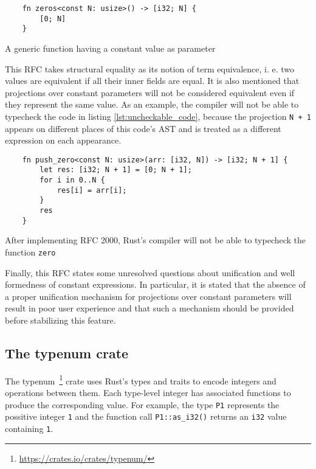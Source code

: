 \begin{listing}[ht]
	\begin{verbatim}
    fn zeros<const N: usize>() -> [i32; N] {
        [0; N]
    }
	\end{verbatim}
    \caption{A generic function having a constant value as parameter}
  \label{lst:const_generics}
\end{listing}

This RFC takes structural equality as its notion of term equivalence, i. e. two
values are equivalent if all their inner fields are equal. It is also mentioned
that projections over constant parameters will not be considered equivalent even
if they represent the same value. As an example, the compiler will not be able
to typecheck the code in listing \ref{lst:uncheckable_code}, because the
projection \texttt{N + 1} appears on different places of this code's AST and is
treated as a different expression on each appearance.

\begin{listing}[ht]
	\begin{verbatim}
    fn push_zero<const N: usize>(arr: [i32, N]) -> [i32; N + 1] {
        let res: [i32; N + 1] = [0; N + 1];
        for i in 0..N {
            res[i] = arr[i];
        }
        res
    }
	\end{verbatim}
  \caption{After implementing RFC 2000, Rust's compiler will not be able to
  typecheck the function \texttt{zero}}
  \label{lst:uncheckable_code}
\end{listing}

Finally, this RFC states some unresolved questions about unification and well
formedness of constant expressions. In particular, it is stated that the absence
of a proper unification mechanism for projections over constant parameters will
result in poor user experience and that such a mechanism should be provided
before stabilizing this feature.

\subsection{The typenum crate}

The typenum~\footnote{\url{https://crates.io/crates/typenum/}} crate uses Rust's
types and traits to encode integers and operations between them. Each type-level
integer has associated functions to produce the corresponding value. For
example, the type \texttt{P1} represents the possitive integer \texttt{1} and
the function call \texttt{P1::as\_i32()} returns an \texttt{i32} value
containing \texttt{1}. 

